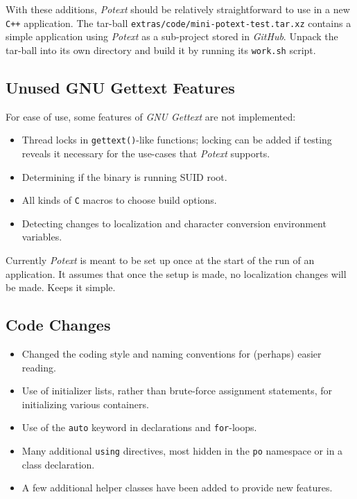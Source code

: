 \documentclass[
 11pt,
 twoside,
 a4paper,
 final                                 %
]{article}
\begin{document}
   With these additions, \textsl{Potext} should be relatively straightforward
   to use in a new \texttt{C++} application.
   The tar-ball
   \texttt{extras/code/mini-potext-test.tar.xz}
   contains a simple application using \textsl{Potext} as a sub-project
   stored in \textsl{GitHub}.
   Unpack the tar-ball into its own directory
   and build it by running its
   \texttt{work.sh} script.

\subsection{Unused GNU Gettext Features}
\label{subsec:introduction_deletions}

   For ease of use, some features of \textsl{GNU Gettext} are not
   implemented:

   \begin{itemize}
      \item Thread locks in \texttt{gettext()}-like functions;
         locking can be added if testing reveals
         it necessary for the use-cases that \textsl{Potext} supports.
      \item Determining if the binary is running SUID root.
      \item All kinds of \texttt{C} macros to choose build options.
      \item Detecting changes to localization and character conversion
         environment variables.
   \end{itemize}

   Currently \textsl{Potext} is meant to be set up once at the start of
   the run of an application.
   It assumes that once the setup is made, no localization changes
   will be made. Keeps it simple.

\subsection{Code Changes}
\label{subsec:introduction_changes}

   \begin{itemize}
      \item Changed the coding style and naming conventions for
         (perhaps) easier reading.
      \item Use of initializer lists, rather than brute-force
         assignment statements, for initializing various containers.
      \item Use of the \texttt{auto} keyword in declarations and
         \texttt{for}-loops.
      \item Many additional \texttt{using} directives, most hidden
         in the \texttt{po} namespace or in a class declaration.
      \item A few additional helper classes have been added to provide
         new features.
   \end{itemize}
\end{document}
